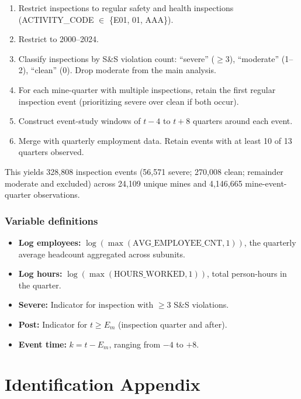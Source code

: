 \documentclass[12pt]{article}
\begin{document}
\begin{enumerate}
\item Restrict inspections to regular safety and health inspections (ACTIVITY\_CODE $\in$ \{E01, 01, AAA\}).
\item Restrict to 2000--2024.
\item Classify inspections by S\&S violation count: ``severe'' ($\geq$3), ``moderate'' (1--2), ``clean'' (0). Drop moderate from the main analysis.
\item For each mine-quarter with multiple inspections, retain the first regular inspection event (prioritizing severe over clean if both occur).
\item Construct event-study windows of $t-4$ to $t+8$ quarters around each event.
\item Merge with quarterly employment data. Retain events with at least 10 of 13 quarters observed.
\end{enumerate}

This yields 328,808 inspection events (56,571 severe; 270,008 clean; remainder moderate and excluded) across 24,109 unique mines and 4,146,665 mine-event-quarter observations.

\subsubsection*{Variable definitions}

{\sloppy
\begin{itemize}
\item \textbf{Log employees:} $\log(\max(\text{AVG\_EMPLOYEE\_CNT}, 1))$, the quarterly average headcount aggregated across subunits.
\item \textbf{Log hours:} $\log(\max(\text{HOURS\_WORKED}, 1))$, total person-hours in the quarter.
\item \textbf{Severe:} Indicator for inspection with $\geq$3 S\&S violations.
\item \textbf{Post:} Indicator for $t \geq E_m$ (inspection quarter and after).
\item \textbf{Event time:} $k = t - E_m$, ranging from $-4$ to $+8$.
\end{itemize}
}


\section{Identification Appendix}
\label{app:identification}
\end{document}
